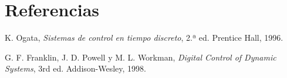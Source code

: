 \documentclass[10pt,twocolumn]{article}
\begin{document}
\section*{Referencias}
\begin{enumerate}[label={[\arabic*]},leftmargin=1.6em,itemsep=0pt,topsep=1pt]
\item K. Ogata, \textit{Sistemas de control en tiempo discreto}, 2.ª ed. Prentice Hall, 1996.
\item G. F. Franklin, J. D. Powell y M. L. Workman, \textit{Digital Control of Dynamic Systems}, 3rd ed. Addison-Wesley, 1998.
\end{enumerate}
\thispagestyle{ultima}
\end{document}
